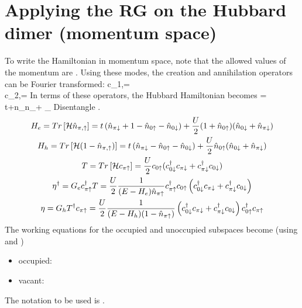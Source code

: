\documentclass[12pt]{article}
\begin{document}
\section{Applying the RG on the Hubbard dimer (momentum space)}
To write the Hamiltonian in momentum space, note that the allowed values of the momentum are . Using these modes, the creation and annihilation operators can be Fourier transformed:
\beq
c_{1,\sigma}=\\
c_{2,\sigma}=
\eeq
In terms of these operators, the Hubbard Hamiltonian becomes
\beq
\ham = t+n_\ua n_\da + \prod_\sigma {}
\eeq
Disentangle \il{\pi\ua}.
\begin{gather}
	H_e = Tr\left[{\mathcal{H} \hat n_{\pi,\uparrow}}\right] = t\left({\hat n_{\pi\downarrow}+1-\hat n_{0\uparrow}-\hat n_{0\downarrow}}\right)+\frac{U}{2}(1+\hat n_{0\uparrow})(\hat n_{0\downarrow}+\hat n_{\pi\downarrow})\\
	H_h = Tr\left[{\mathcal{H} (1-\hat n_{\pi,\uparrow})}\right] = t\left({\hat n_{\pi\downarrow}-\hat n_{0\uparrow}-\hat n_{0\downarrow}}\right)+\frac{U}{2}\hat n_{0\uparrow}(\hat n_{0\downarrow}+\hat n_{\pi\downarrow})\\
	T = Tr \left[{\mathcal{H} c_{\pi\uparrow}}\right] = \frac{U}{2}c_{0\uparrow}(c^\dagger_{0\downarrow}c_{\pi\downarrow}+c^\dagger_{\pi\downarrow}c_{0\downarrow})\\
	\eta^\dagger = G_e c^\dagger_{\pi\uparrow}T= \frac{U}{2}\frac{1}{(E-H_e)\hat n_{\pi\uparrow}}c^\dagger_{\pi\uparrow}c_{0\uparrow}\left({c^\dagger_{0\downarrow}c_{\pi\downarrow}+c^\dagger_{\pi\downarrow}c_{0\downarrow}}\right)\\
	\eta= G_h T^\dagger c_{\pi\uparrow}= \frac{U}{2}\frac{1}{(E-H_h)(1-\hat n_{\pi\uparrow})}\left({c^\dagger_{0\downarrow}c_{\pi\downarrow}+c^\dagger_{\pi\downarrow}c_{0\downarrow}}\right)c^\dagger_{0\uparrow}c_{\pi\uparrow}\\
\end{gather}
The working equations for the occupied and unoccupied subspaces become (using  and )
\begin{itemize}
	\item occupied: 
	\item vacant: 
\end{itemize}
The notation to be used is .
\end{document}
